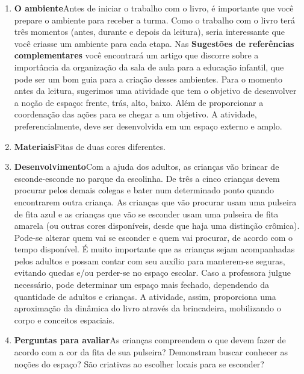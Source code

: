 \documentclass[11pt]{extarticle}
\begin{document}
\begin{enumerate}
\item \textbf{O ambiente}\quad Antes de iniciar o trabalho com o livro, é importante que você 
prepare o ambiente para receber a turma. Como o trabalho com o livro terá 
três momentos (antes, durante e depois da leitura), seria interessante que você 
criasse um ambiente para cada etapa. Nas \textbf{Sugestões de referências complementares} 
você encontrará um artigo que discorre sobre a importância da organização da sala 
de aula para a educação infantil, que pode ser um bom guia para a criação desses 
ambientes.
Para o momento antes da leitura, sugerimos uma atividade que tem o objetivo de desenvolver a noção de espaço: frente, trás, alto, baixo. Além de proporcionar a coordenação das ações para se chegar a um objetivo. A atividade, preferencialmente, deve ser desenvolvida em um espaço externo e amplo.

\item \textbf{Materiais}\quad Fitas de duas cores diferentes.

\item \textbf{Desenvolvimento}\quad Com a ajuda dos adultos, as crianças vão brincar de esconde-esconde no parque da escolinha. De três a cinco crianças devem procurar pelos demais colegas e bater num determinado ponto quando encontrarem outra criança. As crianças que vão procurar usam uma pulseira de fita azul e as crianças que vão se esconder usam uma pulseira de fita amarela (ou outras cores disponíveis, desde que haja uma distinção crômica). Pode-se alterar quem vai se esconder e quem vai procurar, de acordo com o tempo disponível. É muito importante que as crianças sejam acompanhadas pelos adultos e possam contar com seu auxílio para manterem-se seguras, evitando quedas e/ou perder-se no espaço escolar. Caso a professora julgue necessário, pode determinar um espaço mais fechado, dependendo da quantidade de adultos e crianças. A atividade, assim, proporciona uma aproximação da dinâmica do livro através da brincadeira, mobilizando o corpo e conceitos espaciais.

\item \textbf{Perguntas para avaliar}\quad As crianças compreendem o que devem fazer de acordo com a cor da fita de sua pulseira? Demonstram buscar conhecer as noções do espaço? São criativas ao escolher locais para se esconder?

\end{enumerate}
\end{document}
